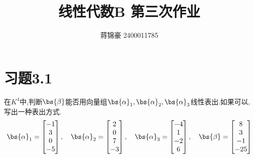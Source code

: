 \documentclass{ctexart}
\title{线性代数B  第三次作业}
\author{蒋锦豪 2400011785}
\date{}
\begin{document}
\maketitle
\section*{习题3.1}
\begin{homework}[3(1)]
    在$K^4$中,判断$\bs{\beta}$能否用向量组$\bs{\alpha}_1,\bs{\alpha}_2,\bs{\alpha}_3$线性表出.如果可以,写出一种表出方式.
    \[\bs{\alpha}_1=\begin{bmatrix}
        -1\\3\\0\\-5
    \end{bmatrix},\quad\bs{\alpha}_2=\begin{bmatrix}
        2\\0\\7\\-3
    \end{bmatrix},\quad\bs{\alpha}_3=\begin{bmatrix}
        -4\\1\\-2\\6
    \end{bmatrix},\quad\bs{\beta}=\begin{bmatrix}
        8\\3\\-1\\-25
    \end{bmatrix}\]
\end{homework}
\end{document}
